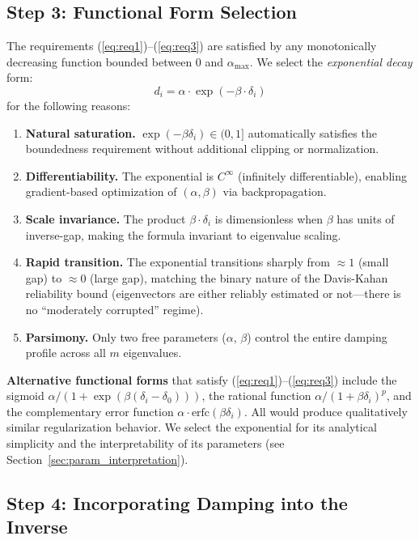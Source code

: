 \documentclass[journal]{IEEEtran}
\begin{document}
\subsection{Step 3: Functional Form Selection}

The requirements (\ref{eq:req1})--(\ref{eq:req3}) are satisfied by any monotonically decreasing function bounded between 0 and $\alpha_{\max}$. We select the \emph{exponential decay} form:
\begin{equation}
d_i = \alpha \cdot \exp(-\beta \cdot \delta_i)
\label{eq:damping_function}
\end{equation}
for the following reasons:

\begin{enumerate}
\item \textbf{Natural saturation.} $\exp(-\beta\delta_i) \in (0, 1]$ automatically satisfies the boundedness requirement without additional clipping or normalization.
\item \textbf{Differentiability.} The exponential is $C^\infty$ (infinitely differentiable), enabling gradient-based optimization of $(\alpha, \beta)$ via backpropagation.
\item \textbf{Scale invariance.} The product $\beta \cdot \delta_i$ is dimensionless when $\beta$ has units of inverse-gap, making the formula invariant to eigenvalue scaling.
\item \textbf{Rapid transition.} The exponential transitions sharply from $\approx 1$ (small gap) to $\approx 0$ (large gap), matching the binary nature of the Davis-Kahan reliability bound (eigenvectors are either reliably estimated or not---there is no ``moderately corrupted'' regime).
\item \textbf{Parsimony.} Only two free parameters ($\alpha$, $\beta$) control the entire damping profile across all $m$ eigenvalues.
\end{enumerate}

\textbf{Alternative functional forms} that satisfy (\ref{eq:req1})--(\ref{eq:req3}) include the sigmoid $\alpha/(1 + \exp(\beta(\delta_i - \delta_0)))$, the rational function $\alpha/(1 + \beta\delta_i)^p$, and the complementary error function $\alpha \cdot \text{erfc}(\beta\delta_i)$. All would produce qualitatively similar regularization behavior. We select the exponential for its analytical simplicity and the interpretability of its parameters (see Section~\ref{sec:param_interpretation}).

\subsection{Step 4: Incorporating Damping into the Inverse}
\end{document}
